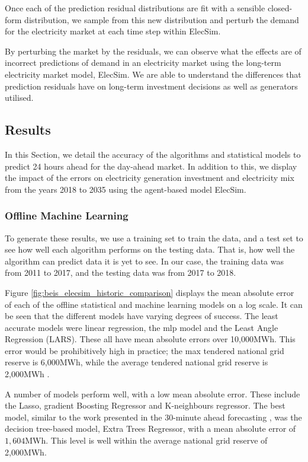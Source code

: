 Once each of the prediction residual distributions are fit with a sensible closed-form distribution, we sample from this new distribution and perturb the demand for the electricity market at each time step within ElecSim.

By perturbing the market by the residuals, we can observe what the effects are of incorrect predictions of demand in an electricity market using the long-term electricity market model, ElecSim. We are able to understand the differences that prediction residuals have on long-term investment decisions as well as generators utilised.




\subsection{Results}
\label{sec:results}

In this Section, we detail the accuracy of the algorithms and statistical models to predict 24 hours ahead for the day-ahead market. In addition to this, we display the impact of the errors on electricity generation investment and electricity mix from the years 2018 to 2035 using the agent-based model ElecSim.



\subsubsection{Offline Machine Learning}

To generate these results, we use a training set to train the data, and a test set to see how well each algorithm performs on the testing data. That is, how well the algorithm can predict data it is yet to see. In our case, the training data was from 2011 to 2017, and the testing data was from 2017 to 2018.

Figure \ref{fig:beis_elecsim_historic_comparison} displays the mean absolute error of each of the offline statistical and machine learning models on a log scale. It can be seen that the different models have varying degrees of success. The least accurate models were linear regression, the \acrfull{mlp} model and the Least Angle Regression (LARS). These all have mean absolute errors over 10,000MWh. This error would be prohibitively high in practice; the max tendered national grid reserve is 6,000MWh, while the average tendered national grid reserve is 2,000MWh \cite{ESO2019}.

A number of models perform well, with a low mean absolute error. These include the Lasso, gradient Boosting Regressor and K-neighbours regressor. The best model, similar to the work presented in the 30-minute ahead forecasting  \cite{Kell2018a}, was the decision tree-based model, Extra Trees Regressor, with a mean absolute error of $1,604$MWh. This level is well within the average national grid reserve of 2,000MWh.



